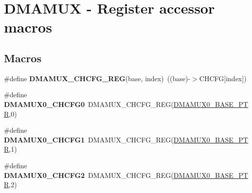 \hypertarget{group___d_m_a_m_u_x___register___accessor___macros}{}\section{D\+M\+A\+M\+UX -\/ Register accessor macros}
\label{group___d_m_a_m_u_x___register___accessor___macros}
\subsection*{Macros}
\begin{DoxyCompactItemize}
\item 
\mbox{\label{group___d_m_a_m_u_x___register___accessor___macros_ga246b1b8df42388bb02a10a8c043f3f4b}} 
\#define {\bfseries D\+M\+A\+M\+U\+X\+\_\+\+C\+H\+C\+F\+G\+\_\+\+R\+EG}(base,  index)~((base)-\/$>$C\+H\+C\+FG\mbox{[}index\mbox{]})
\item 
\mbox{\label{group___d_m_a_m_u_x___register___accessor___macros_gafbdd08eec205390f76af0e1e2aa323cf}} 
\#define {\bfseries D\+M\+A\+M\+U\+X0\+\_\+\+C\+H\+C\+F\+G0}~D\+M\+A\+M\+U\+X\+\_\+\+C\+H\+C\+F\+G\+\_\+\+R\+EG(\hyperlink{group___d_m_a_m_u_x___peripheral_ga403b61d306820e4e1113c636300004a3}{D\+M\+A\+M\+U\+X0\+\_\+\+B\+A\+S\+E\+\_\+\+P\+TR},0)
\item 
\mbox{\label{group___d_m_a_m_u_x___register___accessor___macros_ga8c0edd8cf3e5d5f046ceb4df69c8724b}} 
\#define {\bfseries D\+M\+A\+M\+U\+X0\+\_\+\+C\+H\+C\+F\+G1}~D\+M\+A\+M\+U\+X\+\_\+\+C\+H\+C\+F\+G\+\_\+\+R\+EG(\hyperlink{group___d_m_a_m_u_x___peripheral_ga403b61d306820e4e1113c636300004a3}{D\+M\+A\+M\+U\+X0\+\_\+\+B\+A\+S\+E\+\_\+\+P\+TR},1)
\item 
\mbox{\label{group___d_m_a_m_u_x___register___accessor___macros_gaa1b0bee7c4b71acced055cef09768a29}} 
\#define {\bfseries D\+M\+A\+M\+U\+X0\+\_\+\+C\+H\+C\+F\+G2}~D\+M\+A\+M\+U\+X\+\_\+\+C\+H\+C\+F\+G\+\_\+\+R\+EG(\hyperlink{group___d_m_a_m_u_x___peripheral_ga403b61d306820e4e1113c636300004a3}{D\+M\+A\+M\+U\+X0\+\_\+\+B\+A\+S\+E\+\_\+\+P\+TR},2)
\item 
\mbox{\label{group___d_m_a_m_u_x___register___accessor___macros_ga91901af15d28d4df4369689afa83ed91}} 

\end{DoxyCompactItemize}
